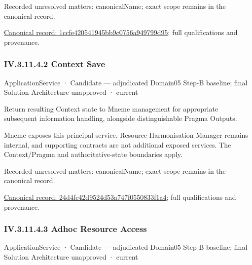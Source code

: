 {\small Recorded unresolved matters: canonicalName; exact scope remains in the canonical record.}\par
{\footnotesize \href{../../../../../../../continuum/application/application-service/1ccfe420541945bb9c0756a949799d95.md}{Canonical record: 1ccfe420541945bb9c0756a949799d95}; full qualifications and provenance.}\par
\subsubsection*{IV.3.11.4.2 Context Save}
\label{navigation:IV.3.11.4.2}

\label{element:24d4fc42d9524d53a747f0550833f1a4}
{\small ApplicationService · Candidate — adjudicated Domain05 Step-B baseline; final Solution Architecture unapproved · current}\par

Return resulting Context state to Mneme management for appropriate subsequent information handling, alongside distinguishable Pragma Outputs.



Mneme exposes this principal service. Resource Harmonisation Manager remains internal, and supporting contracts are not additional exposed services. The Context/Pragma and authoritative-state boundaries apply.


{\small Recorded unresolved matters: canonicalName; exact scope remains in the canonical record.}\par
{\footnotesize \href{../../../../../../../continuum/application/application-service/24d4fc42d9524d53a747f0550833f1a4.md}{Canonical record: 24d4fc42d9524d53a747f0550833f1a4}; full qualifications and provenance.}\par
\subsubsection*{IV.3.11.4.3 Adhoc Resource Access}
\label{navigation:IV.3.11.4.3}

\label{element:410f2f55bbda481b973c6c67b924f0be}
{\small ApplicationService · Candidate — adjudicated Domain05 Step-B baseline; final Solution Architecture unapproved · current}\par

